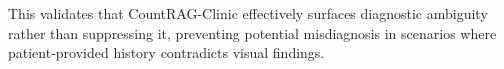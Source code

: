This validates that CountRAG-Clinic effectively surfaces diagnostic ambiguity rather than suppressing it, preventing potential misdiagnosis in scenarios where patient-provided history contradicts visual findings.

\begin{table}[h]
\caption{Counterfactual Belief Shifts under Modality Conflict}
\label{tab:case_study}
\centering
{}
\end{table}
